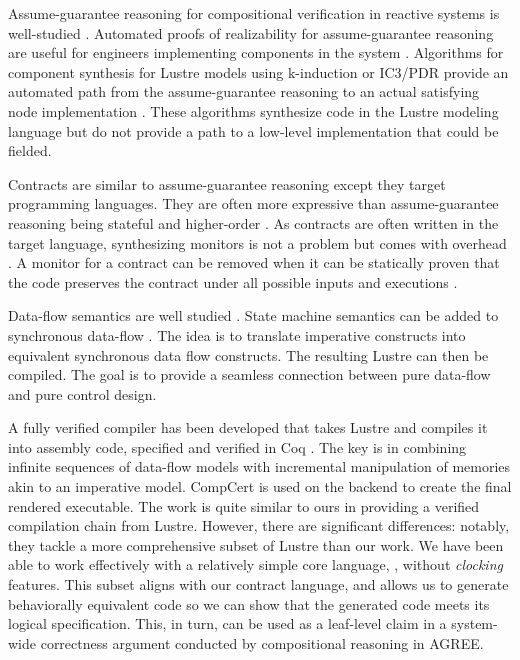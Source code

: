 Assume-guarantee reasoning for compositional verification in reactive systems is well-studied \cite{10.1007/978-3-642-28891-3_13, agree2013, 10.1145/2658982.2527272, 10.1007/978-3-319-17524-9_7}. Automated proofs of realizability for assume-guarantee reasoning are useful for engineers implementing components in the system \cite{10.1007/978-3-319-17524-9_13, 10.1007/978-3-319-29613-5_7}. Algorithms for %
component synthesis for Lustre models using k-induction or IC3/PDR provide an automated path from the assume-guarantee reasoning to an actual satisfying node implementation \cite{katis2017synthesis, 10.1007/978-3-319-89963-3_10}. These algorithms synthesize code in the Lustre modeling language but do not provide a path to a low-level implementation that could be fielded.

Contracts are similar to assume-guarantee reasoning except they target programming languages. They are often more expressive than assume-guarantee reasoning being stateful and higher-order \cite{10.1145/583852.581484}. As contracts are often written in the target language, synthesizing monitors is not a problem but comes with %
overhead \cite{10.1007/978-3-642-28869-2_11}. A monitor for a contract can be removed when it can be statically proven that the code preserves the contract under all possible inputs and executions \cite{10.1145/3158139}.

Data-flow semantics are well studied \cite{10.1145/41625.41641,97300,
10.1145/1379023.1375674,10.1145/2345141.2248426,10.1007/978-3-540-45212-6_10}. State
machine semantics can be added to synchronous
data-flow \cite{10.1145/1086228.1086261}. The idea is to translate
imperative constructs into equivalent synchronous data flow
constructs. The resulting Lustre can then be compiled. The goal is to
provide a seamless connection between pure data-flow and pure control
design.

A fully verified compiler has been developed that takes Lustre and compiles
it into assembly code, specified and verified in Coq \cite{10.1145/3140587.3062358}.
The key is in combining infinite sequences of data-flow models with incremental
manipulation of memories akin to an imperative model. CompCert is used on the
backend to create the final rendered executable. The work is quite similar to
ours in providing a verified compilation chain from Lustre. However,
there are significant differences: notably, they tackle a more
comprehensive subset of Lustre than our work. We have been able to
work effectively with a relatively simple core language, \eg, without
\emph{clocking} features.  This subset aligns with our contract language, and
allows us to generate behaviorally equivalent code so we can show that the
generated code meets its logical specification.  This, in turn,
can be used as a leaf-level claim in a system-wide correctness argument
conducted by compositional reasoning in AGREE.

